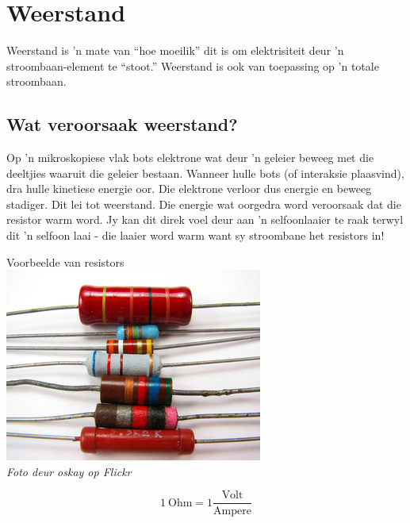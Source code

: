\section{Weerstand}

Weerstand is 'n mate van ``hoe moeilik'' dit is om elektrisiteit deur 'n
stroombaan-element te ``stoot.'' Weerstand is ook van toepassing op 'n totale
stroombaan.
\subsection*{Wat veroorsaak weerstand?}

\begin{minipage}{.5\textwidth}
Op 'n mikroskopiese vlak bots elektrone wat deur 'n geleier beweeg met die
deeltjies waaruit die geleier bestaan. Wanneer hulle bots (of interaksie
plaasvind), dra hulle kinetiese energie oor. Die elektrone verloor dus energie
en beweeg stadiger. Dit lei tot weerstand. Die energie wat oorgedra word
veroorsaak dat die resistor warm word.
Jy kan dit direk voel deur aan 'n selfoonlaaier te raak terwyl dit 'n selfoon
laai - die laaier word warm want sy stroombane het resistors in!
\end{minipage}
\begin{minipage}{.5\textwidth}
\begin{center}
 Voorbeelde van resistors\\
\includegraphics[width=.8\textwidth]{photos/resistors_oskay.jpg}\\
\textit{Foto deur oskay op Flickr}
\end{center}
\end{minipage}

\begin{equation*}
1 \ \text{Ohm} = 1 \frac{\text{Volt}}{ \text{Ampere}}
\end{equation*}

